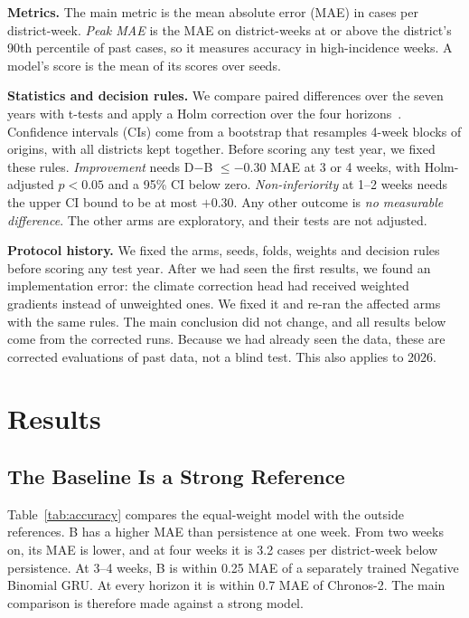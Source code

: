 \documentclass[conference]{IEEEtran}
\begin{document}
\textbf{Metrics.} The main metric is the mean absolute error (MAE) in cases per district-week. \emph{Peak MAE} is the MAE on district-weeks at or above the district's 90th percentile of past cases, so it measures accuracy in high-incidence weeks. A model's score is the mean of its scores over seeds.

\textbf{Statistics and decision rules.} We compare paired differences over the seven years with t-tests and apply a Holm correction over the four horizons~\cite{holm1979simple}. Confidence intervals (CIs) come from a bootstrap that resamples 4-week blocks of origins, with all districts kept together. Before scoring any test year, we fixed these rules. \emph{Improvement} needs D$-$B $\le -0.30$ MAE at 3 or 4 weeks, with Holm-adjusted $p<0.05$ and a 95\% CI below zero. \emph{Non-inferiority} at 1--2 weeks needs the upper CI bound to be at most $+0.30$. Any other outcome is \emph{no measurable difference}. The other arms are exploratory, and their tests are not adjusted.

\textbf{Protocol history.} We fixed the arms, seeds, folds, weights and decision rules before scoring any test year. After we had seen the first results, we found an implementation error: the climate correction head had received weighted gradients instead of unweighted ones. We fixed it and re-ran the affected arms with the same rules. The main conclusion did not change, and all results below come from the corrected runs. Because we had already seen the data, these are corrected evaluations of past data, not a blind test. This also applies to 2026.

\section{Results}

\subsection{The Baseline Is a Strong Reference}

Table~\ref{tab:accuracy} compares the equal-weight model with the outside references. B has a higher MAE than persistence at one week. From two weeks on, its MAE is lower, and at four weeks it is 3.2 cases per district-week below persistence. At 3--4 weeks, B is within 0.25 MAE of a separately trained Negative Binomial GRU. At every horizon it is within 0.7 MAE of Chronos-2. The main comparison is therefore made against a strong model.
\end{document}
